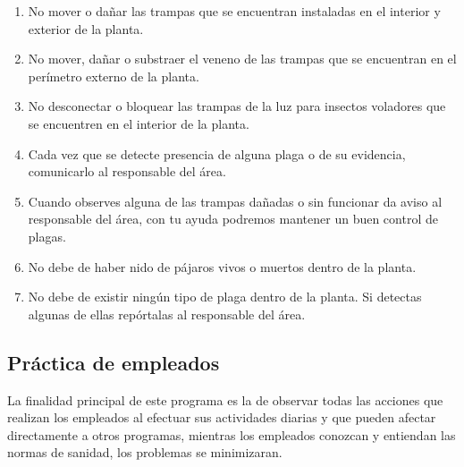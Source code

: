 \begin{enumerate}
	\item No mover o dañar las trampas que se encuentran instaladas en el interior y exterior de la planta.
	\item No mover, dañar o substraer el veneno de las trampas que se encuentran en el perímetro externo de la planta.
	\item No desconectar o bloquear las trampas de la luz para insectos voladores que se encuentren en el interior de la planta.
	\item Cada vez que se detecte presencia de alguna plaga o de su evidencia, comunicarlo al responsable del área.
	\item Cuando observes alguna de las trampas dañadas o sin funcionar da aviso al responsable del área, con tu ayuda podremos mantener un buen control de plagas.
	\item No debe de haber nido de pájaros vivos o muertos dentro de la planta.
	\item No debe de existir ningún tipo de plaga dentro de la planta. Si detectas algunas de ellas repórtalas al responsable del área.
\end{enumerate}

\subsection{Práctica de empleados}

La finalidad principal de este programa es la de observar todas las acciones que realizan los empleados al efectuar sus actividades diarias y que pueden afectar directamente a otros programas, mientras los empleados conozcan y entiendan las normas de sanidad, los problemas se minimizaran.

